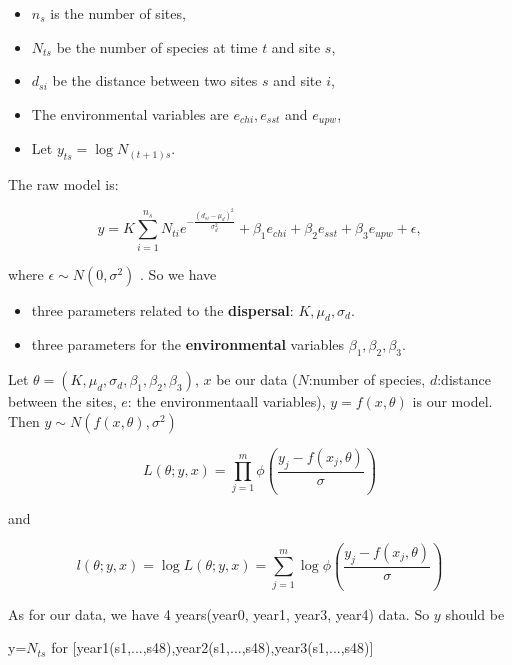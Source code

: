 \documentclass[10pt]{article}
\begin{document}
\begin{itemize}
\item $n_s$ is the number of sites,
\item $N_{ts}$ be the number of species at time $t$ and site $s$,
\item $d_{si}$ be the distance between two sites $s$ and site $i$,
\item The environmental variables are $e_{chi}, e_{sst}$ and $e_{upw}$,
\item Let $y_{ts}=\log N_{(t+1)s}$.
\end{itemize}

The raw model is:

\begin{equation}
y=K\sum_{i=1}^{n_s}N_{ti}e^{-\frac{(d_{si}-\mu_d)^2}{\sigma_d^2}}+\beta_1e_{chi}+\beta_2e_{sst}+
\beta_3e_{upw}+\epsilon,
\end{equation}


where $\epsilon\sim N(0,\sigma^2)$ .  So we have 
\begin{itemize}
\item three parameters related to the \textbf{dispersal}: $K, \mu_d, \sigma_d$.
\item three parameters for the \textbf{environmental} variables $\beta_1, \beta_2, \beta_3$.
\end{itemize}

Let $\theta=(K, \mu_d, \sigma_d, \beta_1, \beta_2, \beta_3)$, $x$ be our data ($N$:number of species, $d$:distance between the sites, $e$: the environmentaall variables), $y=f(x,\theta)$ is our model. Then $y\sim N(f(x,\theta),\sigma^2)$

\begin{equation}
L(\theta;y,x)=\prod_{j=1}^m \phi(\frac{y_j-f(x_j,\theta)}{\sigma})
\end{equation}

and

\begin{equation}
l(\theta;y,x)=\log L(\theta;y,x)=\sum_{j=1}^m \log \phi(\frac{y_j-f(x_j,\theta)}{\sigma})
\end{equation}

As for our data, we have 4 years(year0, year1, year3, year4) data. So $y$ should be

\begin{center}
y=$N_{ts}$ for [year1(s1,...,s48),year2(s1,...,s48),year3(s1,...,s48)]
\end{center}
 
\end{document}
